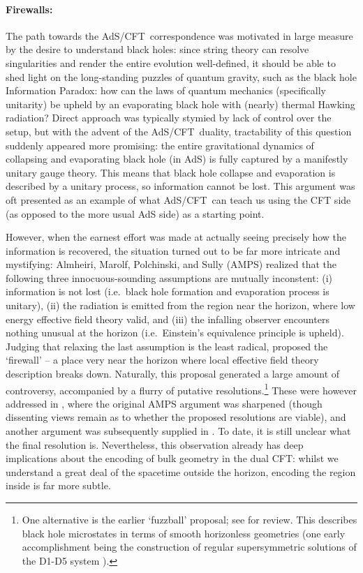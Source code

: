 \documentclass[12pt,a4paper]{article}
\def\AC{AdS/CFT}
\def\QG{quantum gravity}
\begin{document}
\paragraph{Firewalls:}  %
The path towards the \AC\ correspondence was motivated in large measure by the desire to understand black holes: since string theory can resolve singularities and render the entire evolution  well-defined, it should be able to shed light on the long-standing puzzles of \QG, such as the black hole Information Paradox: how can the laws of quantum mechanics (specifically unitarity) be upheld by an evaporating black hole with (nearly) thermal Hawking radiation?  Direct approach was typically stymied by lack of control over the setup, but with the advent of the \AC\ duality, tractability of this question suddenly appeared more promising: the entire gravitational dynamics of collapsing and evaporating black hole (in AdS) is fully captured by a manifestly unitary gauge theory.  This means that black hole collapse and evaporation is described by a unitary process, so information cannot be lost.  This argument was oft presented as an example of what \AC\ can teach us using the CFT side (as opposed to the more usual AdS side) as a starting point.  

However, when the earnest effort was made at actually seeing precisely how the information is recovered, the situation turned out to be far more intricate and mystifying:  Almheiri, Marolf, Polchinski, and Sully (AMPS)  \cite{Almheiri:2012rt} realized that the following three innocuous-sounding assumptions are mutually inconstent: (i) information is not lost (i.e.\ black hole formation and evaporation process is unitary), (ii) the radiation is emitted from the region near the horizon, where low energy effective field theory valid, and (iii) the infalling observer encounters nothing unusual at the horizon (i.e.\ Einstein's equivalence principle is upheld).  Judging that relaxing the last assumption is the least radical, \cite{Almheiri:2012rt} proposed the `firewall' -- a place very near the horizon where local effective field theory description breaks down.  Naturally, this proposal generated a large amount of controversy, accompanied by a flurry of putative resolutions.\footnote{
One alternative is the earlier `fuzzball' proposal; see \cite{Mathur:2008nj} for review.  This describes black hole microstates in terms of smooth horizonless geometries (one early accomplishment being the construction of regular supersymmetric solutions of the D1-D5 system \cite{Lunin:2002iz}).
}  These were however addressed in 
\cite{Almheiri:2013hfa}, where the original AMPS argument was sharpened  (though dissenting views remain as to whether the proposed resolutions are viable), and another argument was subsequently supplied in 
\cite{Marolf:2013dba}.  To date, it is still unclear what the final resolution is.   
Nevertheless, this observation already has deep implications about the encoding of bulk geometry in the dual CFT:  whilst we understand a great deal of the spacetime outside the horizon, encoding the region inside is far more subtle.
\end{document}
